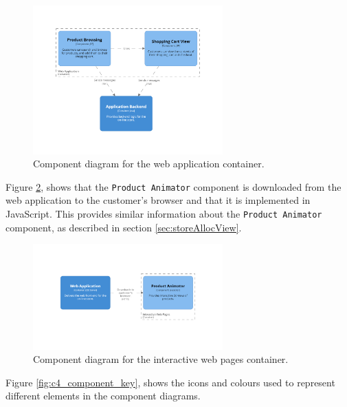 \begin{figure}[h!]
    \centering
    \includegraphics[trim=190 193 190 195,clip,width=0.65\textwidth]{images/c4/webapp_component_diagram.png}
    \caption{Component diagram for the web application container.}
    \label{fig:c4_component_webapp}
\end{figure}

\pagebreak

\noindent
Figure \ref{fig:c4_component_browser}, shows that the \texttt{Product Animator} component
is downloaded from the web application to the customer's browser and that it is implemented in JavaScript.
This provides similar information about the \texttt{Product Animator} component, as described in section \ref{sec:storeAllocView}.

\begin{figure}[h!]
    \centering
    \includegraphics[trim=245 265 245 270,clip,width=0.65\textwidth]{images/c4/browser_component_diagram.png}
    \caption{Component diagram for the interactive web pages container.}
    \label{fig:c4_component_browser}
\end{figure}

\noindent
Figure \ref{fig:c4_component_key}, shows the icons and colours used to represent different elements in the component diagrams.

